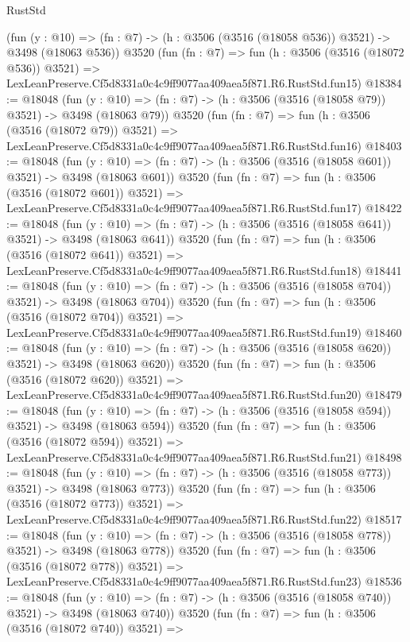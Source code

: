 \begin{lexlean}{RustStd}
\begin{coremodule}
    (fun (y : @10) => (fn : @7) -> (h : @3506 (@3516 (@18058 @536)) @3521) -> @3498 (@18063 @536))
    @3520
    (fun (fn : @7) =>
    fun (h : @3506 (@3516 (@18072 @536)) @3521) =>
    LexLeanPreserve.Cf5d8331a0c4c9ff9077aa409aea5f871.R6.RustStd.fun15)
@18384 := @18048
    (fun (y : @10) => (fn : @7) -> (h : @3506 (@3516 (@18058 @79)) @3521) -> @3498 (@18063 @79))
    @3520
    (fun (fn : @7) =>
    fun (h : @3506 (@3516 (@18072 @79)) @3521) =>
    LexLeanPreserve.Cf5d8331a0c4c9ff9077aa409aea5f871.R6.RustStd.fun16)
@18403 := @18048
    (fun (y : @10) => (fn : @7) -> (h : @3506 (@3516 (@18058 @601)) @3521) -> @3498 (@18063 @601))
    @3520
    (fun (fn : @7) =>
    fun (h : @3506 (@3516 (@18072 @601)) @3521) =>
    LexLeanPreserve.Cf5d8331a0c4c9ff9077aa409aea5f871.R6.RustStd.fun17)
@18422 := @18048
    (fun (y : @10) => (fn : @7) -> (h : @3506 (@3516 (@18058 @641)) @3521) -> @3498 (@18063 @641))
    @3520
    (fun (fn : @7) =>
    fun (h : @3506 (@3516 (@18072 @641)) @3521) =>
    LexLeanPreserve.Cf5d8331a0c4c9ff9077aa409aea5f871.R6.RustStd.fun18)
@18441 := @18048
    (fun (y : @10) => (fn : @7) -> (h : @3506 (@3516 (@18058 @704)) @3521) -> @3498 (@18063 @704))
    @3520
    (fun (fn : @7) =>
    fun (h : @3506 (@3516 (@18072 @704)) @3521) =>
    LexLeanPreserve.Cf5d8331a0c4c9ff9077aa409aea5f871.R6.RustStd.fun19)
@18460 := @18048
    (fun (y : @10) => (fn : @7) -> (h : @3506 (@3516 (@18058 @620)) @3521) -> @3498 (@18063 @620))
    @3520
    (fun (fn : @7) =>
    fun (h : @3506 (@3516 (@18072 @620)) @3521) =>
    LexLeanPreserve.Cf5d8331a0c4c9ff9077aa409aea5f871.R6.RustStd.fun20)
@18479 := @18048
    (fun (y : @10) => (fn : @7) -> (h : @3506 (@3516 (@18058 @594)) @3521) -> @3498 (@18063 @594))
    @3520
    (fun (fn : @7) =>
    fun (h : @3506 (@3516 (@18072 @594)) @3521) =>
    LexLeanPreserve.Cf5d8331a0c4c9ff9077aa409aea5f871.R6.RustStd.fun21)
@18498 := @18048
    (fun (y : @10) => (fn : @7) -> (h : @3506 (@3516 (@18058 @773)) @3521) -> @3498 (@18063 @773))
    @3520
    (fun (fn : @7) =>
    fun (h : @3506 (@3516 (@18072 @773)) @3521) =>
    LexLeanPreserve.Cf5d8331a0c4c9ff9077aa409aea5f871.R6.RustStd.fun22)
@18517 := @18048
    (fun (y : @10) => (fn : @7) -> (h : @3506 (@3516 (@18058 @778)) @3521) -> @3498 (@18063 @778))
    @3520
    (fun (fn : @7) =>
    fun (h : @3506 (@3516 (@18072 @778)) @3521) =>
    LexLeanPreserve.Cf5d8331a0c4c9ff9077aa409aea5f871.R6.RustStd.fun23)
@18536 := @18048
    (fun (y : @10) => (fn : @7) -> (h : @3506 (@3516 (@18058 @740)) @3521) -> @3498 (@18063 @740))
    @3520
    (fun (fn : @7) =>
    fun (h : @3506 (@3516 (@18072 @740)) @3521) =>

\end{coremodule}
\end{lexlean}
